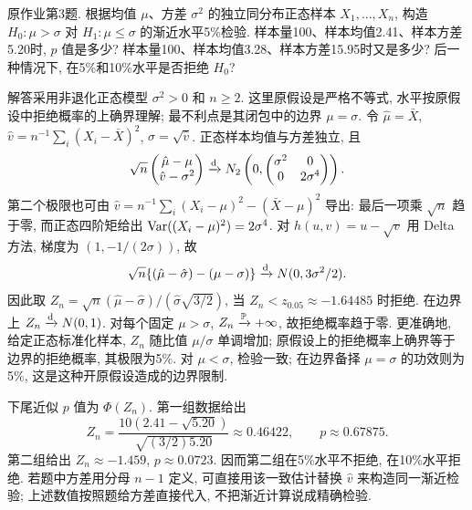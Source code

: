 \begin{exercise}\label{ps05:p03}
原作业第3题. 根据均值 $\mu$、方差 $\sigma^2$ 的独立同分布正态样本 $X_1,\ldots,X_n$, 构造 $H_0:\mu>\sigma$ 对 $H_1:\mu\le\sigma$ 的渐近水平5\%检验. 样本量100、样本均值2.41、样本方差5.20时, $p$ 值是多少? 样本量100、样本均值3.28、样本方差15.95时又是多少? 后一种情况下, 在5\%和10\%水平是否拒绝 $H_0$?
\end{exercise}
\begin{solution}
解答采用非退化正态模型 $\sigma^2>0$ 和 $n\ge2$. 这里原假设是严格不等式, 水平按原假设中拒绝概率的上确界理解; 最不利点是其闭包中的边界 $\mu=\sigma$. 令 $\hat\mu=\bar X$, $\hat v=n^{-1}\sum_i(X_i-\bar X)^2$, $\hat\sigma=\sqrt{\hat v}$. 正态样本均值与方差独立, 且
\[
\sqrt n\begin{pmatrix}\hat\mu-\mu\\\hat v-\sigma^2\end{pmatrix}
\xrightarrow{\mathrm d} N_2\left(0,\begin{pmatrix}\sigma^2&0\\0&2\sigma^4\end{pmatrix}\right).
\]
第二个极限也可由 $\hat v=n^{-1}\sum_i(X_i-\mu)^2-(\bar X-\mu)^2$ 导出: 最后一项乘 $\sqrt n$ 趋于零, 而正态四阶矩给出 $\operatorname{Var}((X_i-\mu)^2)=2\sigma^4$. 对 $h(u,v)=u-\sqrt v$ 用 Delta 方法, 梯度为 $(1,-1/(2\sigma))$, 故
\[
\sqrt n\{(\hat\mu-\hat\sigma)-(\mu-\sigma)\}\xrightarrow{\mathrm d} N(0,3\sigma^2/2).
\]
因此取 $Z_n=\sqrt n(\hat\mu-\hat\sigma)/(\hat\sigma\sqrt{3/2})$, 当 $Z_n<z_{0.05}\approx-1.64485$ 时拒绝. 在边界上 $Z_n\xrightarrow{\mathrm d} N(0,1)$. 对每个固定 $\mu>\sigma$, $Z_n\xrightarrow{\mathbb P}+\infty$, 故拒绝概率趋于零. 更准确地, 给定正态标准化样本, $Z_n$ 随比值 $\mu/\sigma$ 单调增加; 原假设上的拒绝概率上确界等于边界的拒绝概率, 其极限为5\%. 对 $\mu<\sigma$, 检验一致; 在边界备择 $\mu=\sigma$ 的功效则为5\%, 这是这种开原假设造成的边界限制.

下尾近似 $p$ 值为 $\Phi(Z_n)$. 第一组数据给出
\[
Z_n=\frac{10(2.41-\sqrt{5.20})}{\sqrt{(3/2)5.20}}\approx0.46422,
\qquad p\approx0.67875.
\]
第二组给出 $Z_n\approx-1.459$, $p\approx0.0723$. 因而第二组在5\%水平不拒绝, 在10\%水平拒绝. 若题中方差用分母 $n-1$ 定义, 可直接用该一致估计替换 $\hat v$ 来构造同一渐近检验; 上述数值按照题给方差直接代入, 不把渐近计算说成精确检验.
\end{solution}
